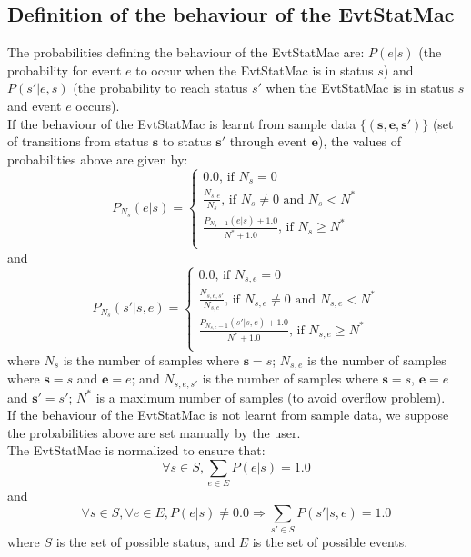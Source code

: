 \documentclass[12pt, a4paper]{article}
\begin{document}
\subsection{Definition of the behaviour of the EvtStatMac}

The probabilities defining the behaviour of the EvtStatMac are: $P(e|s)$ (the probability for event $e$ to occur when the EvtStatMac is in status $s$) and $P(s'|e,s)$ (the probability to reach status $s'$ when the EvtStatMac is in status $s$ and event $e$ occurs).\\

If the behaviour of the EvtStatMac is learnt from sample data $\{(\bm{s},\bm{e},\bm{s'})\}$ (set of transitions from status $\bm{s}$ to status $\bm{s'}$ through event $\bm{e}$), the values of probabilities above are given by:\\
\begin{equation}
\label{eqnProbEvt}
P_{N_s}(e|s)=
\left\lbrace
\begin{array}{l}
0.0\textrm{, if }N_s = 0\\
\frac{N_{s,e}}{N_s}\textrm{, if }N_s \neq 0\textrm{ and }N_s<N^*\\
\frac{P_{N_s-1}(e|s)+1.0}{N^*+1.0}\textrm{, if }N_s\ge N^*\\
\end{array}
\right.
\end{equation}
and
\begin{equation}
\label{eqnProbTrans}
P_{N_s}(s'|s,e)=
\left\lbrace
\begin{array}{l}
0.0\textrm{, if }N_{s,e} = 0\\
\frac{N_{s,e,s'}}{N_{s,e}}\textrm{, if }N_{s,e} \neq 0\textrm{ and }N_{s,e}<N^*\\
\frac{P_{N_{s,e}-1}(s'|s,e)+1.0}{N^*+1.0}\textrm{, if }N_{s,e}\ge N^*\\
\end{array}
\right.
\end{equation}
where $N_{s}$ is the number of samples where $\bm{s}=s$; $N_{s,e}$ is the number of samples where $\bm{s}=s$ and $\bm{e}=e$; and $N_{s,e,s'}$ is the number of samples where $\bm{s}=s$, $\bm{e}=e$ and $\bm{s'}=s'$; $N^*$ is a maximum number of samples (to avoid overflow problem).\\

If the behaviour of the EvtStatMac is not learnt from sample data, we suppose the probabilities above are set manually by the user.\\

The EvtStatMac is normalized to ensure that:\\
\begin{equation}
\forall{s\in S},\sum_{e\in E}P(e|s)=1.0
\end{equation}
and 
\begin{equation}
\forall{s\in S},\forall{e\in E},P(e|s)\neq0.0\Rightarrow\sum_{s'\in S}P(s'|s,e)=1.0
\end{equation}
where $S$ is the set of possible status, and $E$ is the set of possible events.\\
\end{document}
